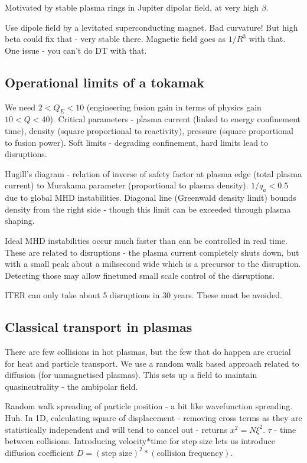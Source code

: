 \documentclass[PlasmaNotes.tex]{subfiles}
\begin{document}
    Motivated by stable plasma rings in Jupiter dipolar field, at very high $\beta$.
    
    Use dipole field by a levitated superconducting magnet. Bad curvature! But high beta could fix that - very stable there. Magnetic field goes as $1/R^3$ with that. One issue - you can't do DT with that.

\subsection{Operational limits of a tokamak}
  
    We need $2<Q_E<10$ (engineering fusion gain in terms of physics gain $10<Q<40$). Critical parameters - plasma current (linked to energy confinement time), density (square proportional to reactivity), pressure (square proportional to fusion power). Soft limits - degrading confinement, hard limits lead to disruptions.
    
    Hugill's diagram - relation of inverse of safety factor at plasma edge (total plasma current) to Murakama parameter (proportional to plasma density). $1/q_a < 0.5$ due to global MHD instabilities. Diagonal line (Greenwald density limit) bounds density from the right side - though this limit can be exceeded through plasma shaping.
    
    Ideal MHD instabilities occur much faster than can be controlled in real time. These are related to disruptions - the plasma current completely shuts down, but with a small peak about a milisecond wide which is a precursor to the disruption. Detecting those may allow finetuned small scale control of the disruptions.
    
    ITER can only take about 5 disruptions in 30 years. These must be avoided.
    
\subsection{Classical transport in plasmas}

  There are few collisions in hot plasmas, but the few that do happen are crucial for heat and particle transport. We use a random walk based approach related to diffusion (for unmagnetised plasmas). This sets up a field to maintain quasineutrality - the ambipolar field. 
  
  Random walk spreading of particle position - a bit like wavefunction spreading. Huh. In 1D, calculating square of displacement - removing cross terms as they are statistically independent and will tend to cancel out - returns $x^2=N\xi^2$. $\tau$ - time between collisions. Introducing velocity$*$time for step size lets us introduce diffusion coefficient $D=(\text{step size})^2*(\text{collision frequency})$.
  
\end{document}

